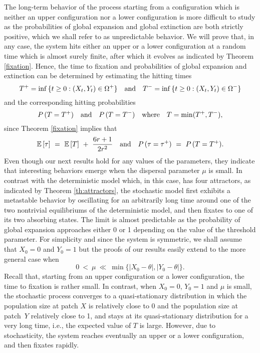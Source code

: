 \indent The long-term behavior of the process starting from a configuration which is neither an upper configuration nor
 a lower configuration is more difficult to study as the probabilities of global expansion and global extinction are both
 strictly positive, which we shall refer to as unpredictable behavior.
 We will prove that, in any case, the system hits either an upper or a lower configuration at a random time which is almost
 surely finite, after which it evolves as indicated by Theorem \ref{fixation}.
 Hence, the time to fixation and probabilities of global expansion and extinction can be determined by estimating the
 hitting times
 $$ T^+ = \inf \,\{t \geq 0 : (X_t, Y_t) \in \Omega^+ \} \quad \hbox{and} \quad
    T^- = \inf \,\{t \geq 0 : (X_t, Y_t) \in \Omega^- \} $$
 and the corresponding hitting probabilities
 $$ P \,(T = T^+) \quad \hbox{and} \quad
    P \,(T = T^-) \quad \hbox{where} \quad T = \min (T^+, T^-), $$
 since Theorem \ref{fixation} implies that
 $$ {\mathbb{E}} \,[\tau] \ = \ {\mathbb{E}} \,[T] \ + \ \frac{6r + 1}{2r^2} \quad \hbox{and} \quad
  P \,(\tau = \tau^+) \ = \ P \,(T = T^+). $$
 Even though our next results hold for any values of the parameters, they indicate that interesting behaviors emerge
 when the dispersal parameter $\mu$ is small.
 In contrast with the deterministic model which, in this case, has four attractors, as indicated
 by Theorem \ref{th:attractors}, the stochastic model first exhibits a metastable behavior by oscillating for an arbitrarily
 long time around one of the two nontrivial equilibriums of the deterministic model, and then fixates to one of its two
 absorbing states.
 The limit is almost predictable as the probability of global expansion approaches either 0 or 1 depending on the
 value of the threshold parameter.
 For simplicity and since the system is symmetric, we shall assume that $X_0 = 0$ and $Y_0 = 1$ but the proofs of our results
 easily extend to the more general case when
 $$ 0 \ < \ \mu \ \ll \ \min \{|X_0 - \theta|, |Y_0 - \theta| \}. $$
 Recall that, starting from an upper configuration or a lower configuration, the time to fixation is rather small.
 In contrast, when $X_0 = 0$, $Y_0 = 1$ and $\mu$ is small, the stochastic process converges to a quasi-stationary distribution
 in which the population size at patch $X$ is relatively close to 0 and the population size at patch~$Y$ relatively close to 1,
 and stays at its quasi-stationary distribution for a very long time, i.e., the expected value of $T$ is large.
 However, due to stochasticity, the system reaches eventually an upper or a lower configuration, and then fixates rapidly.
